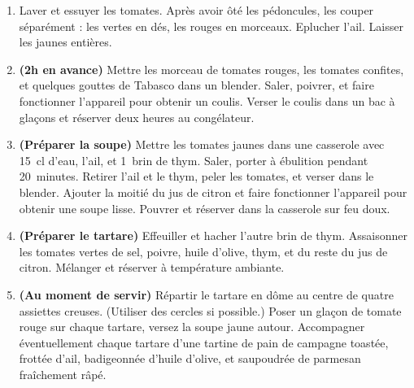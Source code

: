 
\begin{ingredients}
\end{ingredients}


\begin{recipe}
  \begin{enumerate}

  \item Laver et essuyer les tomates.  Après avoir ôté les pédoncules,
    les couper séparément : les vertes en dés, les rouges en morceaux.
    Eplucher l'ail.  Laisser les jaunes entières.

  \item \textbf{(2h en avance)} Mettre les morceau de tomates rouges,
    les tomates confites, et quelques gouttes de Tabasco dans un
    blender.  Saler, poivrer, et faire fonctionner l'appareil pour
    obtenir un coulis.  Verser le coulis dans un bac à glaçons et
    réserver deux heures au congélateur.

  \item \textbf{(Préparer la soupe)} Mettre les tomates jaunes dans
    une casserole avec 15~cl d'eau, l'ail, et 1~brin de thym.  Saler,
    porter à ébulition pendant 20~minutes.  Retirer l'ail et le thym,
    peler les tomates, et verser dans le blender.  Ajouter la moitié
    du jus de citron et faire fonctionner l'appareil pour obtenir une
    soupe lisse.  Pouvrer et réserver dans la casserole sur feu doux.

  \item \textbf{(Préparer le tartare)} Effeuiller et hacher l'autre
    brin de thym.  Assaisonner les tomates vertes de sel, poivre,
    huile d'olive, thym, et du reste du jus de citron.  Mélanger et
    réserver à température ambiante.

  \item \textbf{(Au moment de servir)} Répartir le tartare en dôme au
    centre de quatre assiettes creuses.  (Utiliser des cercles si
    possible.)  Poser un glaçon de tomate rouge sur chaque tartare,
    versez la soupe jaune autour.  Accompagner éventuellement chaque
    tartare d'une tartine de pain de campagne toastée, frottée d'ail,
    badigeonnée d'huile d'olive, et saupoudrée de parmesan
    fraîchement râpé.

  \end{enumerate}
\end{recipe}

